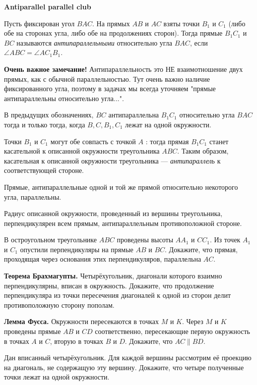 \centerline{\bf \Huge Antiparallel parallel club}
\centerline{\bf \Huge }

Пусть фиксирован угол $B A C$. На прямых $A B$ и $A C$ взяты точки $B_1$ и $C_1$ (либо обе на сторонах угла, либо обе на продолжениях сторон). Тогда прямые $B_1 C_1$ и $B C$ называются \textit{антипараллельными} относительно угла $B A C$, если $\angle A B C=\angle A C_1 B_1$. 

\textbf{Очень важное замечание!} Антипараллельность это НЕ взаимотношение двух прямых, как с обычной параллельностью. Тут очень важно наличие фиксированного угла, поэтому в задачах мы всегда уточняем "прямые антипараллельны относительно угла..."\!.

 В предыдущих обозначениях, $B C$ антипараллельна $B_1 C_1$ относительно угла $BAC$ тогда и только тогда, когда $B, C, B_1, C_1$ лежат на одной окружности.

 Точки $B_1$ и $C_1$ могут обе совпасть с точкой $A$ : тогда прямая $B_1 C_1$ станет касательной к описанной окружности треугольника $A B C$. Таким образом, касательная к описанной окружности треугольника --- \textit{антипараллель} к соответствующей стороне. 

Прямые, антипараллельные одной и той же прямой относительно некоторого угла, параллельны.

Радиус описанной окружности, проведенный из вершины треугольника, перпендикулярен всем прямым, антипараллельным противоположной стороне.

В остроугольном треугольнике $A B C$ проведены высоты $A A_1$ и $C C_1$. Из точек $A_1$ и $C_1$ опустили перпендикуляры на прямые $A B$ и $B C$. Докажите, что прямая, проходящая через основания этих перпендикуляров, параллельна $A C$.

\textbf{Теорема Брахмагупты.}
Четырёхугольник, диагонали которого взаимно перпендикулярны, вписан в окружность. Докажите, что продолжение перпендикуляра из точки пересечения диагоналей к одной из сторон делит противоположную сторону пополам.

\textbf{Лемма Фусса.}
Окружности пересекаются в точках $M$ и $K$. Через $M$ и $K$ проведены прямые $A B$ и $C D$ соответственно, пересекающие первую окружность в точках $A$ и $C$, вторую в точках $B$ и $D$. Докажите, что $A C \| B D$.

Дан вписанный четырёхугольник. Для каждой вершины рассмотрим её проекцию на диагональ, не содержащую эту вершину. Докажите, что четыре полученные точки лежат на одной окружности.

